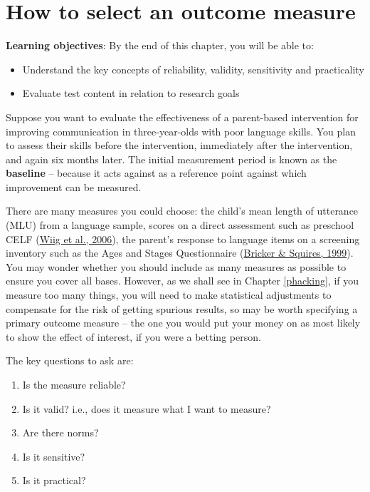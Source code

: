 \documentclass{krantz}
\providecommand{\tightlist}{%
\setlength{\itemsep}{0pt}\setlength{\parskip}{0pt}}
\begin{document}
\hypertarget{reliability}{%
\chapter{How to select an outcome measure}\label{reliability}}

\textbf{Learning objectives}: By the end of this chapter, you will be able to:

\begin{itemize}
\item
  Understand the key concepts of reliability, validity, sensitivity and practicality
\item
  Evaluate test content in relation to research goals
\end{itemize}

Suppose you want to evaluate the effectiveness of a parent-based intervention for improving communication in three-year-olds with poor language skills. You plan to assess their skills before the intervention, immediately after the intervention, and again six months later. The initial measurement period is known as the \textbf{baseline} -- because it acts against as a reference point against which improvement can be measured.

There are many measures you could choose: the child's mean length of utterance (MLU) from a language sample, scores on a direct assessment such as preschool CELF (\protect\hyperlink{ref-wiig2006}{Wiig et al., 2006}), the parent's response to language items on a screening inventory such as the Ages and Stages Questionnaire (\protect\hyperlink{ref-bricker1999}{Bricker \& Squires, 1999}). You may wonder whether you should include as many measures as possible to ensure you cover all bases. However, as we shall see in Chapter \ref{phacking}, if you measure too many things, you will need to make statistical adjustments to compensate for the risk of getting spurious results, so may be worth specifying a primary outcome measure -- the one you would put your money on as most likely to show the effect of interest, if you were a betting person.

The key questions to ask are:

\begin{enumerate}
\def\labelenumi{\arabic{enumi}.}
\tightlist
\item
  Is the measure reliable?
\item
  Is it valid? i.e., does it measure what I want to measure?
\item
  Are there norms?
\item
  Is it sensitive?
\item
  Is it practical?
\end{enumerate}
\end{document}
